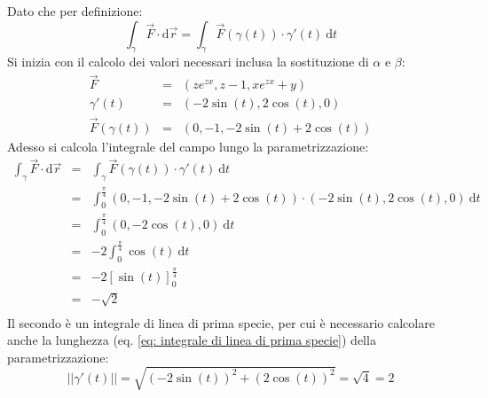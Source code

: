 \documentclass[a4paper]{article}
\begin{document}
	\noindent
	Dato che per definizione:
	\begin{equation*}
		\displaystyle\int_{\gamma} \overset{\rightarrow}{F} \cdot \mathrm{d}\overrightarrow{r} = \displaystyle\int_{\gamma} \overset{\rightarrow}{F}\left(\gamma\left(t\right)\right) \cdot \gamma'\left(t\right) \:\mathrm{d}t
	\end{equation*}
	Si inizia con il calcolo dei valori necessari inclusa la sostituzione di $\alpha$ e $\beta$:
	\begin{equation*}
		\begin{array}{rcl}
			\overset{\rightarrow}{F} &=& \left(ze^{zx}, z-1, xe^{zx}+y\right) \\ [.5em]
			\gamma'\left(t\right) &=& \left(-2\sin\left(t\right), 2\cos\left(t\right), 0\right) \\ [.5em]
			\overset{\rightarrow}{F}\left(\gamma\left(t\right)\right) &=& \left(0, -1, -2\sin\left(t\right)+2\cos\left(t\right)\right)
		\end{array}
	\end{equation*}
	Adesso si calcola l'integrale del campo lungo la parametrizzazione:
	\begin{equation*}
		\begin{array}{rcl}
			\displaystyle\int_{\gamma} \overset{\rightarrow}{F} \cdot \mathrm{d}\overrightarrow{r} 
			&=&
			\displaystyle\int_{\gamma} \overset{\rightarrow}{F}\left(\gamma\left(t\right)\right) \cdot \gamma'\left(t\right) \:\mathrm{d}t \\ [1.5em]
			&=&
			\displaystyle\int_{0}^{\frac{\pi}{4}} \left(0, -1, -2\sin\left(t\right)+2\cos\left(t\right)\right) \cdot \left(-2\sin\left(t\right), 2\cos\left(t\right), 0\right) \:\mathrm{d}t \\ [1.5em]
			&=&
			\displaystyle\int_{0}^{\frac{\pi}{4}} \left(0, -2\cos\left(t\right), 0\right) \:\mathrm{d}t \\ [1.5em]
			&=&
			-2\displaystyle\int_{0}^{\frac{\pi}{4}} \cos\left(t\right) \:\mathrm{d}t \\ [1.5em]
			&=&
			-2\left[\sin\left(t\right)\right]_{0}^{\frac{\pi}{4}} \\ [1.5em]
			&=&
			-\sqrt{2} \\ [1.5em]
		\end{array}
	\end{equation*}
	Il secondo è un integrale di linea di prima specie, per cui è necessario calcolare anche la lunghezza (eq. \ref{eq: integrale di linea di prima specie}) della parametrizzazione:
	\begin{equation*}
		\left|\left| \gamma'\left(t\right) \right|\right| = \sqrt{\left(-2\sin\left(t\right)\right)^{2} + \left(2\cos\left(t\right)\right)^{2}} = \sqrt{4} = 2
	\end{equation*}\newpage
\end{document}
